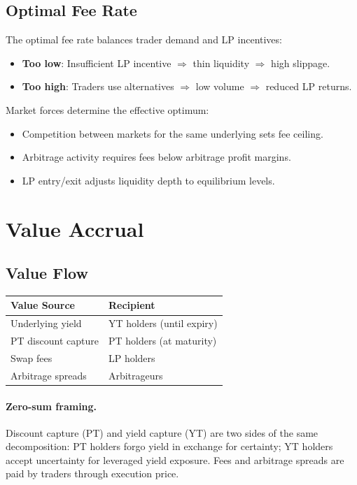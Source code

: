 \subsection{Optimal Fee Rate}

The optimal fee rate balances trader demand and LP incentives:
\begin{itemize}
\item \textbf{Too low}: Insufficient LP incentive $\Rightarrow$ thin liquidity $\Rightarrow$ high slippage.
\item \textbf{Too high}: Traders use alternatives $\Rightarrow$ low volume $\Rightarrow$ reduced LP returns.
\end{itemize}

Market forces determine the effective optimum:
\begin{itemize}
\item Competition between markets for the same underlying sets fee ceiling.
\item Arbitrage activity requires fees below arbitrage profit margins.
\item LP entry/exit adjusts liquidity depth to equilibrium levels.
\end{itemize}

\section{Value Accrual}

\subsection{Value Flow}

\begin{center}
\begin{tabular}{ll}
\toprule
\textbf{Value Source} & \textbf{Recipient} \\
\midrule
Underlying yield & YT holders (until expiry) \\
PT discount capture & PT holders (at maturity) \\
Swap fees & LP holders \\
Arbitrage spreads & Arbitrageurs \\
\bottomrule
\end{tabular}
\end{center}

\paragraph{Zero-sum framing.}
Discount capture (PT) and yield capture (YT) are two sides of the same decomposition: PT holders forgo yield in exchange for certainty; YT holders accept uncertainty for leveraged yield exposure. Fees and arbitrage spreads are paid by traders through execution price.

